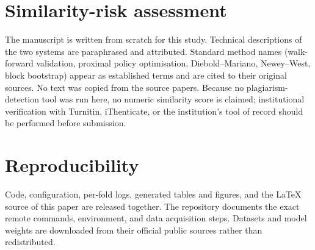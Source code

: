 \documentclass[conference]{IEEEtran}
\begin{document}
\section*{Similarity-risk assessment}
The manuscript is written from scratch for this study. Technical descriptions
of the two systems are paraphrased and attributed. Standard method names
(walk-forward validation, proximal policy optimisation, Diebold--Mariano,
Newey--West, block bootstrap) appear as established terms and are cited to
their original sources. No text was copied from the source papers. Because no
plagiarism-detection tool was run here, no numeric similarity score is claimed;
institutional verification with Turnitin, iThenticate, or the institution's
tool of record should be performed before submission.

\section*{Reproducibility}
Code, configuration, per-fold logs, generated tables and figures, and the
LaTeX source of this paper are released together. The repository documents the
exact remote commands, environment, and data acquisition steps. Datasets and
model weights are downloaded from their official public sources rather than
redistributed.



\end{document}
